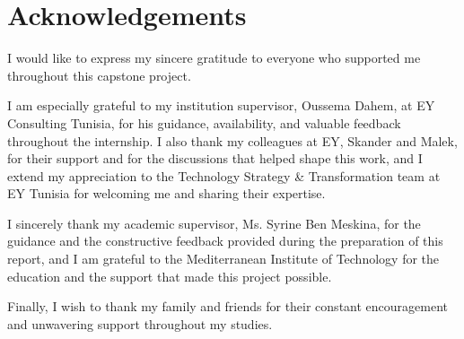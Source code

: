 
\section*{\hfill Acknowledgements \hfill}


\vspace{1.4cm}
\large
\noindent
I would like to express my sincere gratitude to everyone who supported me throughout this capstone project.

\vspace{0.4cm}
\noindent
I am especially grateful to my institution supervisor, Oussema Dahem, at EY Consulting Tunisia, for his guidance, availability, and valuable feedback throughout the internship. I also thank my colleagues at EY, Skander and Malek, for their support and for the discussions that helped shape this work, and I extend my appreciation to the Technology Strategy \& Transformation team at EY Tunisia for welcoming me and sharing their expertise.

\vspace{0.4cm}
\noindent
I sincerely thank my academic supervisor, Ms. Syrine Ben Meskina, for the guidance and the constructive feedback provided during the preparation of this report, and I am grateful to the Mediterranean Institute of Technology for the education and the support that made this project possible.

\vspace{0.4cm}
\noindent
Finally, I wish to thank my family and friends for their constant encouragement and unwavering support throughout my studies.
